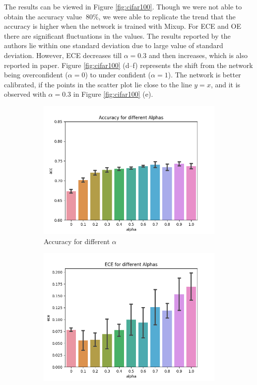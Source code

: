 The results can be viewed in Figure \ref{fig:cifar100}. Though we were not able to obtain the accuracy value $~80\%$, we were able to replicate the trend that the accuracy is higher when the network is trained with Mixup. For ECE and OE there are significant fluctuations in the values. The results reported by the authors lie within one standard deviation due to large value of standard deviation. However, ECE decreases till $\alpha=0.3$ and then increases, which is also reported in paper. Figure \ref{fig:cifar100} (d--f) represents the shift from the network being overconfident ($\alpha=0$) to under confident ($\alpha=1$). The network is better calibrated, if the points in the scatter plot lie close to the line $y=x$, and it is observed with $\alpha=0.3$ in Figure \ref{fig:cifar100} (e).
\begin{figure}[h]
     \centering
     \begin{subfigure}[b]{0.31\textwidth}
         \centering
         \includegraphics[width=\textwidth]{images/cifar/accuracyValpha.png}
         \caption{Accuracy for different $\alpha$}
     \end{subfigure}
     \begin{subfigure}[b]{0.31\textwidth}
         \centering
         \includegraphics[width=\textwidth]{images/cifar/eceValpha.png}

\end{subfigure}
\end{figure}
